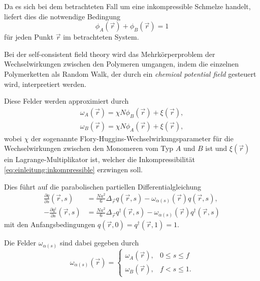 Da es sich bei dem betrachteten Fall um eine inkompressible Schmelze handelt,
liefert dies die notwendige Bedingung
\begin{equation}
\label{eq:einleitung:inkompressible}
    \phi_{A}(\vec{r}) + \phi_{B}(\vec{r}) = 1
\end{equation}
für jeden Punkt $\vec{r}$ im betrachteten System.

Bei der self-consistent field theory wird das Mehrkörperproblem der Wechselwirkungen zwischen den Polymeren umgangen, indem die einzelnen Polymerketten als Random Walk, der durch ein \emph{chemical potential field} gesteuert wird, interpretiert werden.

Diese Felder werden approximiert durch
\begin{equation}
\label{eq:einleitung:felder}
    \begin{aligned}
        \omega_{A}(\vec{r}) = \chi N \phi_{B}(\vec{r}) + \xi(\vec{r}),\\
        \omega_{B}(\vec{r}) = \chi N \phi_{A}(\vec{r}) + \xi(\vec{r}),
    \end{aligned}
\end{equation}
wobei $\chi$ der sogenannte Flory-Huggins-Wechselwirkungsparameter für die Wechselwirkungen zwischen den Monomeren vom Typ $A$ und $B$ ist und $\xi(\vec{r})$ ein Lagrange-Multiplikator ist, welcher die Inkompressibilität \eqref{eq:einleitung:inkompressible} erzwingen soll.


Dies führt auf die parabolischen partiellen Differentialgleichung
\begin{equation}
\label{eq:einleitung:mde}
    \begin{aligned}
        \frac{\partial q}{\partial s}(\vec{r}, s) &= \frac{N a^{2}}{6} \Delta_{\vec{r}} q(\vec{r}, s) - \omega_{\alpha(s)}(\vec{r}) q(\vec{r}, s),\\
        -\frac{\partial q^{\dagger}}{\partial s}(\vec{r}, s) &= \frac{N a^{2}}{6} \Delta_{\vec{r}} q^{\dagger}(\vec{r}, s) - \omega_{\alpha(s)}(\vec{r}) q^{\dagger}(\vec{r}, s)
    \end{aligned}
\end{equation}
mit den Anfangsbedingungen $q(\vec{r}, 0) = q^{\dagger}(\vec{r}, 1) = 1$.

Die Felder $\omega_{\alpha(s)}$ sind dabei gegeben durch
\begin{equation}
    \omega_{\alpha(s)}(\vec{r}) = \begin{cases}
        \omega_{A}(\vec{r}), & 0 \leq s \leq f\\
        \omega_{B}(\vec{r}), & f < s \leq 1.
    \end{cases}
\end{equation}

